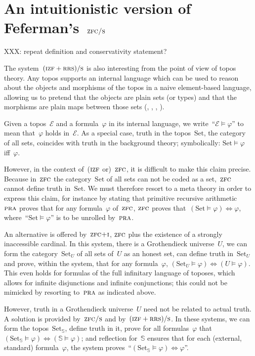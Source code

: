 \documentclass[oneside,reqno]{amsart}
\theoremstyle{definition}
\theoremstyle{plain}
\theoremstyle{remark}
\newcommand{\E}{\mathcal{E}}
\renewcommand{\SS}{\mathbb{S}}
\newcommand{\Set}{\mathrm{Set}}
\renewcommand{\_}{\mathpunct{.}\,}
\newcommand{\?}{\,{:}\,}
\newcommand{\PRA}{\textsc{pra}}
\newcommand{\IZF}{\textsc{izf}}
\newcommand{\ZFC}{\textsc{zfc}}
\newcommand{\ZFCS}{\textsc{zfc/s}}
\newcommand{\ZFCI}{\textsc{zfc+i}}
\newcommand{\RRS}{\textsc{rrs}}
\newcommand{\ES}{(\IZF+\RRS)/\textsc{s}}
\begin{document}
\section{An intuitionistic version of Feferman's~$\ZFCS$}

XXX: repeat definition and conservativity statement?

The system~$\ES$ is also interesting from the point of view of topos theory.
Any topos supports an internal language which can be used to reason about the
objects and morphisms of the topos in a naive element-based language, allowing
us to pretend that the objects are plain sets (or types) and that the morphisms
are plain maps between those sets (\cite[Chapter~6]{borceux:handbook3},
\cite[Section~1.3]{caramello:ttt}, \cite[Chapter~14]{goldblatt:topoi},
\cite[Chapter~VI]{moerdijk-maclane:sheaves-logic}).

Given a topos~$\mathcal{E}$ and a formula~$\varphi$ in its internal language,
we write~``$\mathcal{E} \models \varphi$'' to mean that~$\varphi$ holds
in~$\E$. As a special case, truth in the topos~$\Set$, the category of all sets,
coincides with truth in the background theory; symbolically: $\Set \models
\varphi$ iff~$\varphi$.

However, in the context of~($\IZF$ or)~$\ZFC$, it is difficult to make this
claim precise. Because in~$\ZFC$ the category~$\Set$ of all sets can not be
coded as a set,~$\ZFC$ cannot define truth in~$\Set$. We must therefore resort
to a meta theory in order to express this claim, for instance by stating
that primitive recursive arithmetic~$\PRA$ proves that for any
formula~$\varphi$ of~$\ZFC$, $\ZFC$ proves that~$(\Set \models \varphi)
\Leftrightarrow \varphi$, where~``$\Set \models \varphi$'' is to be unrolled
by~$\PRA$.

An alternative is offered by~$\ZFCI$, $\ZFC$ plus the existence of a
strongly inaccessible cardinal. In this system, there is a Grothendieck
universe~$U$, we can form the category~$\Set_U$ of all sets of~$U$ as an honest
set, can define truth in~$\Set_U$ and prove, within the system, that for any
formula~$\varphi$, $(\Set_U \models \varphi) \Leftrightarrow (U \models
\varphi)$. This even holds for formulas of the full infinitary language of
toposes, which allows for infinite disjunctions and infinite conjunctions; this
could not be mimicked by resorting to~$\PRA$ as indicated above.

However, truth in a Grothendieck universe~$U$ need not be related to actual
truth. A solution is provided by~$\ZFCS$ and by~$\ES$. In these systems, we can
form the topos~$\Set_\SS$, define truth in it, prove for all formulas~$\varphi$
that~$(\Set_\SS \models \varphi) \Leftrightarrow (\SS \models \varphi)$; and
reflection for~$\SS$ ensures that for each (external, standard)
formula~$\varphi$, the system proves~``$(\Set_\SS \models \varphi)
\Leftrightarrow \varphi$''.

\printbibliography
\end{document}
